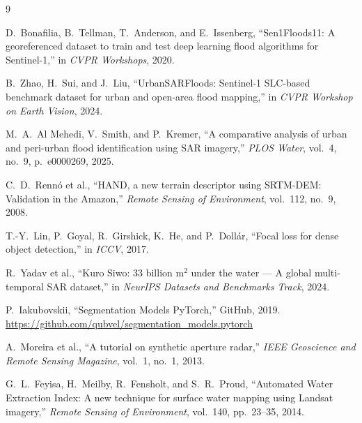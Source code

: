 \documentclass[10pt,twocolumn]{article}
\begin{document}

\begin{thebibliography}{9}

D.~Bonafilia, B.~Tellman, T.~Anderson, and E.~Issenberg,
``Sen1Floods11: A georeferenced dataset to train and test deep learning
flood algorithms for Sentinel-1,'' in \emph{CVPR Workshops}, 2020.

B.~Zhao, H.~Sui, and J.~Liu,
``UrbanSARFloods: Sentinel-1 SLC-based benchmark dataset for urban and
open-area flood mapping,'' in \emph{CVPR Workshop on Earth Vision}, 2024.

M.~A.~Al Mehedi, V.~Smith, and P.~Kremer,
``A comparative analysis of urban and peri-urban flood identification
using SAR imagery,'' \emph{PLOS Water}, vol.~4, no.~9, p.~e0000269,
2025.

C.~D.~Renn\'{o} et al.,
``HAND, a new terrain descriptor using SRTM-DEM: Validation in the
Amazon,'' \emph{Remote Sensing of Environment}, vol.~112, no.~9, 2008.

T.-Y.~Lin, P.~Goyal, R.~Girshick, K.~He, and P.~Doll\'{a}r,
``Focal loss for dense object detection,'' in \emph{ICCV}, 2017.

R.~Yadav et al.,
``Kuro Siwo: 33 billion m$^2$ under the water --- A global multi-temporal
SAR dataset,'' in \emph{NeurIPS Datasets and Benchmarks Track}, 2024.

P.~Iakubovskii,
``Segmentation Models PyTorch,'' GitHub, 2019.
\url{https://github.com/qubvel/segmentation_models.pytorch}

A.~Moreira et al.,
``A tutorial on synthetic aperture radar,''
\emph{IEEE Geoscience and Remote Sensing Magazine}, vol.~1, no.~1, 2013.

G.~L.~Feyisa, H.~Meilby, R.~Fensholt, and S.~R.~Proud,
``Automated Water Extraction Index: A new technique for surface water
mapping using Landsat imagery,'' \emph{Remote Sensing of Environment},
vol.~140, pp.~23--35, 2014.

\end{thebibliography}
\end{document}
